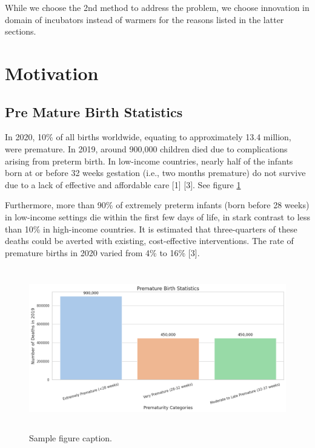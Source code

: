 \documentclass{article}
\begin{document}
While we choose the 2nd method to address the problem, we choose
innovation in domain of incubators instead of warmers for the reasons
listed in the latter sections.

\section{Motivation}\label{motivation}

\subsection{Pre Mature Birth
Statistics}\label{pre-mature-birth-statistics}

In 2020, 10\% of all births worldwide, equating to approximately 13.4
million, were premature. In 2019, around 900,000 children died due to
complications arising from preterm birth. In low-income countries,
nearly half of the infants born at or before 32 weeks gestation (i.e.,
two months premature) do not survive due to a lack of effective and
affordable care {[}1{]} {[}3{]}. See figure \ref{fig:fig1}

Furthermore, more than 90\% of extremely preterm infants (born before 28
weeks) in low-income settings die within the first few days of life, in
stark contrast to less than 10\% in high-income countries. It is
estimated that three-quarters of these deaths could be averted with
existing, cost-effective interventions. The rate of premature births in
2020 varied from 4\% to 16\% {[}3{]}.

\begin{figure}
  \centering
  \includegraphics[width=350pt,height=200pt]{images/clipboard-1098342472.png} %
  \caption{Sample figure caption.}
  \label{fig:fig1}
\end{figure}
\end{document}
